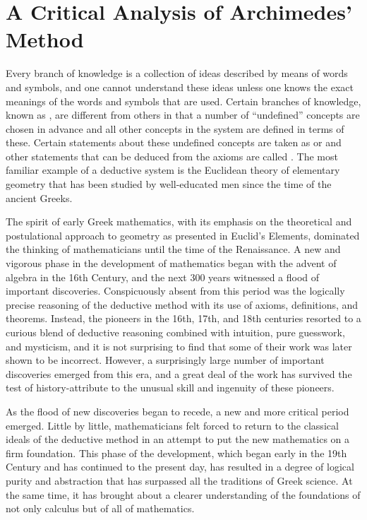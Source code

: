 \section{A Critical Analysis of Archimedes' Method}\label{sec:1.1.5}

\begin{note}
  Every branch of knowledge is a collection of ideas described by means of words and symbols, and one cannot understand these ideas unless one knows the exact meanings of the words and symbols that are used.
  Certain branches of knowledge, known as \textbf{}, are different from others in that a number of ``undefined'' concepts are chosen in advance and all other concepts in the system are defined in terms of these.
  Certain statements about these undefined concepts are taken as \textbf{} or \textbf{} and other statements that can be deduced from the axioms are called \textbf{}.
  The most familiar example of a deductive system is the Euclidean theory of elementary geometry that has been studied by well-educated men since the time of the ancient Greeks.

  The spirit of early Greek mathematics, with its emphasis on the theoretical and postulational approach to geometry as presented in Euclid's Elements, dominated the thinking of mathematicians until the time of the Renaissance.
  A new and vigorous phase in the development of mathematics began with the advent of algebra in the 16th Century, and the next 300 years witnessed a flood of important discoveries.
  Conspicuously absent from this period was the logically precise reasoning of the deductive method with its use of axioms, definitions, and theorems.
  Instead, the pioneers in the 16th, 17th, and 18th centuries resorted to a curious blend of deductive reasoning combined with intuition, pure guesswork, and mysticism, and it is not surprising to find that some of their work was later shown to be incorrect.
  However, a surprisingly large number of important discoveries emerged from this era, and a great deal of the work has survived the test of history-attribute to the unusual skill and ingenuity of these pioneers.

  As the flood of new discoveries began to recede, a new and more critical period emerged.
  Little by little, mathematicians felt forced to return to the classical ideals of the deductive method in an attempt to put the new mathematics on a firm foundation.
  This phase of the development, which began early in the 19th Century and has continued to the present day, has resulted in a degree of logical purity and abstraction that has surpassed all the traditions of Greek science.
  At the same time, it has brought about a clearer understanding of the foundations of not only calculus but of all of mathematics.


\end{note}
